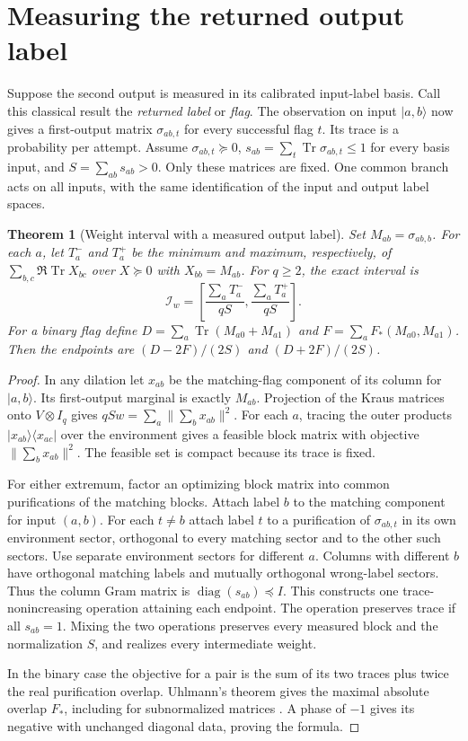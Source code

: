 \documentclass[11pt,letterpaper]{article}
\newtheorem{theorem}{Theorem}\newtheorem{proposition}[theorem]{Proposition}
\newcommand{\tr}{\operatorname{Tr}}\newcommand{\ket}[1]{\lvert#1\rangle}\newcommand{\proj}[1]{\ket{#1}\!\langle#1\rvert}
\begin{document}
\section{Measuring the returned output label}
Suppose the second output is measured in its calibrated input-label basis. Call this classical result the \emph{returned label} or \emph{flag}. The observation on input $\ket{a,b}$ now gives a first-output matrix $\sigma_{ab,t}$ for every successful flag $t$. Its trace is a probability per attempt. Assume $\sigma_{ab,t}\succeq0$, $s_{ab}=\sum_t\tr\sigma_{ab,t}\le1$ for every basis input, and $S=\sum_{ab}s_{ab}>0$. Only these matrices are fixed. One common branch acts on all inputs, with the same identification of the input and output label spaces.

\begin{theorem}[Weight interval with a measured output label]
Set $M_{ab}=\sigma_{ab,b}$. For each $a$, let $T_a^-$ and $T_a^+$ be the minimum and maximum, respectively, of $\sum_{b,c}\Re\tr X_{bc}$ over $X\succeq0$ with $X_{bb}=M_{ab}$. For $q\ge2$, the exact interval is
\[
 \mathcal I_w=\left[\frac{\sum_a T_a^-}{qS},\frac{\sum_a T_a^+}{qS}\right].
\]
For a binary flag define $D=\sum_a\tr(M_{a0}+M_{a1})$ and $F=\sum_a F_*(M_{a0},M_{a1})$. Then the endpoints are $(D-2F)/(2S)$ and $(D+2F)/(2S)$.
\end{theorem}
\begin{proof}
In any dilation let $x_{ab}$ be the matching-flag component of its column for $\ket{a,b}$. Its first-output marginal is exactly $M_{ab}$. Projection of the Kraus matrices onto $V\otimes I_q$ gives $qSw=\sum_a\|\sum_b x_{ab}\|^2$. For each $a$, tracing the outer products $|x_{ab}\rangle\langle x_{ac}|$ over the environment gives a feasible block matrix with objective $\|\sum_b x_{ab}\|^2$. The feasible set is compact because its trace is fixed.

For either extremum, factor an optimizing block matrix into common purifications of the matching blocks. Attach label $b$ to the matching component for input $(a,b)$. For each $t\ne b$ attach label $t$ to a purification of $\sigma_{ab,t}$ in its own environment sector, orthogonal to every matching sector and to the other such sectors. Use separate environment sectors for different $a$. Columns with different $b$ have orthogonal matching labels and mutually orthogonal wrong-label sectors. Thus the column Gram matrix is $\operatorname{diag}(s_{ab})\preceq I$. This constructs one trace-nonincreasing operation attaining each endpoint. The operation preserves trace if all $s_{ab}=1$. Mixing the two operations preserves every measured block and the normalization $S$, and realizes every intermediate weight.

In the binary case the objective for a pair is the sum of its two traces plus twice the real purification overlap. Uhlmann's theorem gives the maximal absolute overlap $F_*$, including for subnormalized matrices \cite[Thm.~3.22]{watrous}. A phase of $-1$ gives its negative with unchanged diagonal data, proving the formula.
\end{proof}
\end{document}

